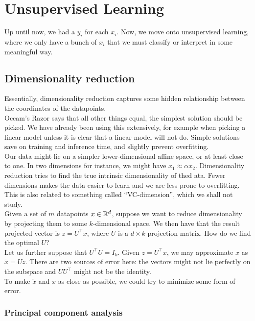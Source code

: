 \documentclass{article}
\begin{document}
\clearpage

\section{Unsupervised Learning}

	Up until now, we had a $y_i$ for each $x_i$. Now, we move onto unsupervised learning, where we only have a bunch of $x_i$ that we must classify or interpret in some meaningful way.

	\subsection{Dimensionality reduction}

		Essentially, dimensionality reduction captures some hidden relationship between the coordinates of the datapoints.\\

		Occam's Razor says that all other things equal, the simplest solution should be picked. We have already been using this extensively, for example when picking a linear model unless it is clear that a linear model will not do. Simple solutions save on training and inference time, and slightly prevent overfitting.\\
		Our data might lie on a simpler lower-dimensional affine space, or at least close to one. In two dimensions for instance, we might have $x_1 \approx \alpha x_2$. Dimensionality reduction tries to find the true intrinsic dimensionality of thed ata. Fewer dimensions makes the data easier to learn and we are less prone to overfitting.\\
		This is also related to something called ``VC-dimension'', which we shall not study.\\

		Given a set of $m$ datapoints $x\in\mathbb{R}^d$, suppose we want to reduce dimensionality by projecting them to some $k$-dimensional space. We then have that the result projected vector is $z = U^\top x$, where $U$ is a $d\times k$ projection matrix. How do we find the optimal $U$?\\
		Let us further suppose that $U^\top U = I_k$. Given $z = U^\top x$, we may approximate $x$ as $\tilde{x} = U z$. There are two sources of error here: the vectors might not lie perfectly on the subspace and $UU^\top$ might not be the identity.\\
		To make $\tilde{x}$ and $x$ as close as possible, we could try to minimize some form of error.

		\subsubsection{Principal component analysis}
\end{document}
